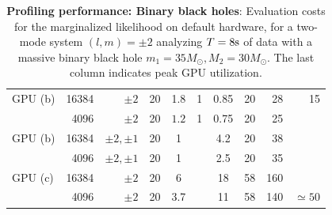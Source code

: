 \documentclass[twocolumn,prd,nofootinbib]{revtex4}
\newcommand\unit[1]{{\rm #1}}
\newcommand\editremark[1]{{\color{red} #1}}
\begin{document}
\begin{table}
\begin{tabular}{lrr|ccccc|rr}
GPU (b) & 16384 & $\pm 2$ & 20  & 1.8 & 1 & 0.85& 20 &28 & 15\\
       & 4096 & $\pm 2$  & 20 & $1.2 $ &  1  & 0.75 & 20  & 25\\ \hline
GPU (b) & 16384 & $\pm 2, \pm 1$ & 20 & 1 && 4.2 & 20  & 38  \\
       & 4096 & $\pm 2, \pm 1$ & 20 & 1&& 2.5  & 20 & 35 & \\ \hline
%
GPU (c) & 16384 & $\pm 2 $  & 20  &6  & & 18&  58&160 &  \\
            & 4096 &$\pm 2 $  &  20 & 3.7 & & 11  & 58  & 140 & $\simeq 50$ \\
\end{tabular}
\caption{\label{tab:CostBreakdown}\textbf{Profiling performance: Binary black holes}: Evaluation costs for the
  marginalized likelihood on default
  hardware, for a two-mode system $(l,m)=\pm 2$ analyzing $T=8\unit{s}$ of data with a massive binary black hole
  $m_1=35 M_\odot,M_2=30 M_\odot$.  The last column indicates peak GPU utilization.
}
\end{table}
\end{document}
